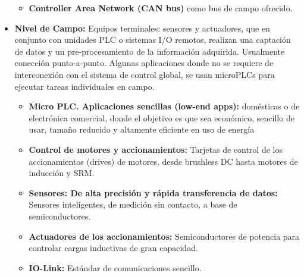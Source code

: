 \documentclass[10pt,graphicx,caption,rotating]{article}
\begin{document}
\begin{itemize}
\begin{itemize}
    \item \textbf{Controller Area Network (CAN bus)} como bus de campo ofrecido.
  \end{itemize}
  \item \textbf{Nivel de Campo:} Equipos terminales: sensores y actuadores, que en conjunto con unidades PLC o sistemas I/O remotos, realizan una captación de datos y un pre-procesamiento de la información adquirida. Usualmente conección punto-a-punto. Algunas aplicaciones donde no se requiere de interconexión con el sistema de control global, se usan microPLCs para ejecutar tareas individuales en campo.
  \begin{itemize}
    \item \textbf{Micro PLC. Aplicaciones sencillas (low-end apps):} domésticas o de electrónica comercial, donde el objetivo es que sea económico, sencillo de usar, tamaño reducido y altamente eficiente en uso de energía
    \item \textbf{Control de motores y accionamientos:} Tarjetas de control de los accionamientos (drives) de motores, desde brushless DC hasta motores de inducción y SRM.
    \item \textbf{Sensores: De alta precisión y rápida transferencia de datos:} Sensores inteligentes, de medición sin contacto, a base de semiconductores.
    \item \textbf{Actuadores de los accionamientos:} Semiconductores de potencia para controlar cargas inductivas de gran capacidad.
    \item \textbf{IO-Link:} Estándar de comunicaciones sencillo.
  \end{itemize}
\end{itemize}
\end{document}
